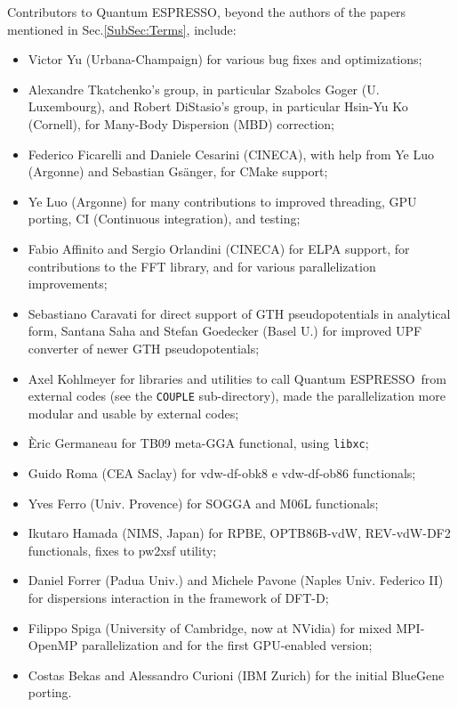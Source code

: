 \documentclass[12pt,a4paper]{article}
\def\qe{{\sc Quantum ESPRESSO}}
\def\libxc{\texttt{libxc}}
\begin{document}
Contributors to \qe, beyond the authors of the papers
mentioned in Sec.\ref{SubSec:Terms}, include:
\begin{itemize}
  \item Victor Yu (Urbana-Champaign) for various bug fixes and
	optimizations;
  \item Alexandre Tkatchenko's group, in particular Szabolcs Goger
  (U. Luxembourg), and Robert DiStasio's group, in particular
  Hsin-Yu Ko (Cornell), for Many-Body Dispersion (MBD) correction;
  \item Federico Ficarelli and Daniele Cesarini (CINECA), with help
  from Ye Luo (Argonne) and Sebastian Gs\"anger, for CMake support;
  \item Ye Luo (Argonne) for many contributions to improved threading,
  GPU porting, CI (Continuous integration), and testing;
  \item Fabio Affinito and Sergio Orlandini (CINECA) for ELPA support, 
  for contributions to the FFT library, and for various parallelization
  improvements;
  \item Sebastiano Caravati for direct support of GTH pseudopotentials
  in analytical form, Santana Saha and Stefan Goedecker (Basel U.)
  for improved UPF converter of newer GTH pseudopotentials;
  \item Axel Kohlmeyer for libraries and utilities to call \qe\
  from external codes (see the \texttt{COUPLE} sub-directory), made the
  parallelization more modular and usable by external codes;
  \item \`Eric Germaneau for TB09 meta-GGA functional, using \libxc;
  \item Guido Roma (CEA Saclay) for  vdw-df-obk8  e vdw-df-ob86 functionals;
  \item Yves Ferro (Univ. Provence) for SOGGA and M06L functionals;
  \item Ikutaro Hamada (NIMS, Japan) for RPBE, OPTB86B-vdW, REV-vdW-DF2
	  functionals, fixes to pw2xsf utility;
  \item Daniel Forrer (Padua Univ.) and Michele Pavone
        (Naples Univ. Federico II) for dispersions interaction in the
        framework of DFT-D;
\item Filippo Spiga (University of Cambridge, now at NVidia)
  for mixed MPI-OpenMP parallelization and for the first
  GPU-enabled version;
  \item Costas Bekas and Alessandro Curioni (IBM Zurich) for the initial
  BlueGene porting.
\end{itemize}
\end{document}
